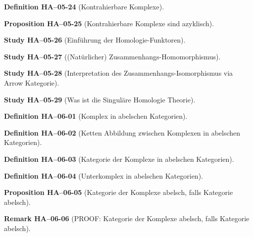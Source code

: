 \documentclass[10pt, letterpaper]{article}
\newcommand{\CustomHeading}[3]{%
  \par\medskip\noindent%
  \textbf{#1 #2} \textnormal{(#3)}.\enskip%
}
\newenvironment{DEF}[2]{\CustomHeading{Definition}{#1}{#2}}{}
\newenvironment{PROP}[2]{\CustomHeading{Proposition}{#1}{#2}}{}
\newenvironment{REM}[2]{\CustomHeading{Remark}{#1}{#2}}{}
\newenvironment{STUD}[2]{\CustomHeading{Study}{#1}{#2}}{}
\begin{document}
\begin{DEF}{HA--05-24}{Kontrahierbare Komplexe}
\end{DEF}

\begin{PROP}{HA--05-25}{Kontrahierbare Komplexe sind azyklisch}
\end{PROP}

\begin{STUD}{HA--05-26}{Einführung der Homologie-Funktoren}
\end{STUD}

\begin{STUD}{HA--05-27}{(Natürlicher) Zusammenhangs-Homomorphismus}
\end{STUD}

\begin{STUD}{HA--05-28}{Interpretation des Zusammenhangs-Isomorphismus via Arrow Kategorie}
\end{STUD}

\begin{STUD}{HA--05-29}{Was ist die Singuläre Homologie Theorie}
\end{STUD}

\begin{DEF}{HA--06-01}{Komplex in abelschen Kategorien}
\end{DEF}

\begin{DEF}{HA--06-02}{Ketten Abbildung zwischen Komplexen in abelschen Kategorien}
\end{DEF}

\begin{DEF}{HA--06-03}{Kategorie der Komplexe in abelschen Kategorien}
\end{DEF}

\begin{DEF}{HA--06-04}{Unterkomplex in abelschen Kategorien}
\end{DEF}

\begin{PROP}{HA--06-05}{Kategorie der Komplexe abelsch, falls Kategorie abelsch}
\end{PROP}

\begin{REM}{HA--06-06}{PROOF: Kategorie der Komplexe abelsch, falls Kategorie abelsch}
\end{REM}
\end{document}
